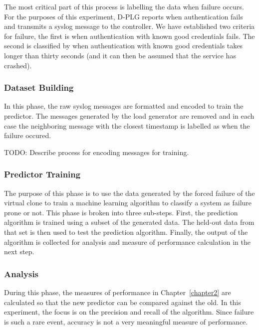 The most critical part of this process is labelling the data when failure
occurs.  For the purposes of this experiment, D-PLG reports when authentication
fails and transmits a syslog message to the controller.  We have established
two criteria for failure, the first is when authentication with known good
credentials fails.  The second is classified by when authentication with known
good credentials takes longer than thirty seconds (and it can then be assumed
that the service has crashed).

\subsubsection{Dataset Building}
In this phase, the raw syslog messages are formatted and encoded to train the
predictor.  The messages generated by the load generator are removed and in
each case the neighboring message with the closest timestamp is labelled as
when the failure occured.

TODO:  Describe process for encoding messages for training.

\subsubsection{Predictor Training}
The purpose of this phase is to use the data generated by the forced failure of
the virtual clone to train a machine learning algorithm to classify a system as
failure prone or not.  This phase is broken into three sub-steps.  First, the
prediction algorithm is trained using a subset of the generated data.  The
held-out data from that set is then used to test the prediction algorithm.
Finally, the output of the algorithm is collected for analysis and measure of
performance calculation in the next step.

\subsubsection{Analysis}
During this phase, the measures of performance in Chapter~\ref{chapter2} are
calculated so that the new predictor can be compared against the old.  In this
experiment, the focus is on the precision and recall of the algorithm.  Since
failure is such a rare event, accuracy is not a very meaningful measure of
performance.

